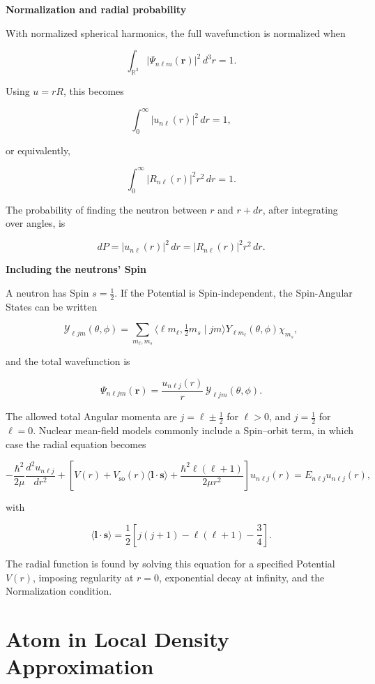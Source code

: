 \documentclass[a4paper, 10pt, onepage]{elegantbook}
\begin{document}
{\medskip

   \textbf{Normalization and radial probability}

With normalized spherical harmonics, the full wavefunction is normalized when

\[
\int_{\mathbb R^3}|\Psi_{n\ell m}(\mathbf r)|^2\,d^3r=1.
\]

Using \(u=rR\), this becomes

\[
\int_0^\infty |u_{n\ell}(r)|^2\,dr=1,
\]

or equivalently,

\[
\int_0^\infty |R_{n\ell}(r)|^2r^2\,dr=1.
\]

The probability of finding the neutron between \(r\) and \(r+dr\), after integrating over angles, is

\[
dP=|u_{n\ell}(r)|^2\,dr
=|R_{n\ell}(r)|^2r^2\,dr.
\]

   \textbf{Including the neutrons' Spin}

A neutron has Spin \(s=\tfrac12\). If the Potential is Spin-independent, the Spin-Angular States can be written

\[
\mathcal{Y}_{\ell jm}(\theta,\phi)
=
\sum_{m_\ell,m_s}
\langle \ell m_\ell,\tfrac12 m_s\mid jm\rangle
Y_{\ell m_\ell}(\theta,\phi)\chi_{m_s},
\]

and the total wavefunction is

\[
\Psi_{n\ell jm}(\mathbf r)
=\frac{u_{n\ell j}(r)}{r}\,
\mathcal{Y}_{\ell jm}(\theta,\phi).
\]

The allowed total Angular momenta are \(j=\ell\pm\tfrac12\) for \(\ell>0\), 
and \(j=\tfrac12\) for \(\ell=0\). Nuclear mean-field models commonly include a Spin–orbit term, 
in which case the radial equation becomes

\[
-\frac{\hbar^2}{2\mu}\frac{d^2u_{n\ell j}}{dr^2}
+
\left[
V(r)+V_{\mathrm{so}}(r)\langle\mathbf l\cdot\mathbf s\rangle
+\frac{\hbar^2\ell(\ell+1)}{2\mu r^2}
\right]u_{n\ell j}(r)
=E_{n\ell j}u_{n\ell j}(r),
\]

with

\[
\langle\mathbf l\cdot\mathbf s\rangle
=\frac12\left[j(j+1)-\ell(\ell+1)-\frac34\right].
\]

The radial function is found by solving this equation for a specified Potential \(V(r)\), 
imposing regularity at \(r=0\), exponential decay at infinity, and the Normalization condition.

\newpage

\section{Atom in Local Density Approximation}
\setlength{\emergencystretch}{2em}

}
\end{document}
